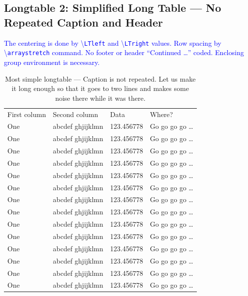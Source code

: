 \documentclass[phd]{ndsu-thesis-2022}
\newcommand\italk[1]{\textcolor{blue}{#1}}  %
\newcommand\cmd[1]{\textbackslash\texttt{#1}}  %
\begin{document}
\subsection{Longtable 2: Simplified Long Table --- No Repeated Caption and Header}

\italk{The centering is done by \cmd{LTleft} and \cmd{LTright} values. Row spacing by \cmd{arraystretch} command. No footer or header ``Continued \ldots'' coded. Enclosing group environment is necessary.}

\begingroup
\setlength{\LTleft}{1mm plus -1fill}%
\setlength{\LTright}{\LTleft}%
\renewcommand{\arraystretch}{0.5}%
\begin{longtable}{l l l l}
\captionsetup{width=\textwidth}
\caption{Most simple longtable --- Caption is not repeated. Let us make it long enough so that it goes to two lines and makes some noise there while it was there.}\\[-20pt]%
\toprule
First column & Second column & Data & Where?\\
\midrule
One & abcdef ghjijklmn & 123.456778  & Go go go go \ldots \\
One & abcdef ghjijklmn & 123.456778  & Go go go go \ldots \\
One & abcdef ghjijklmn & 123.456778  & Go go go go \ldots \\
One & abcdef ghjijklmn & 123.456778  & Go go go go \ldots \\
One & abcdef ghjijklmn & 123.456778  & Go go go go \ldots \\
One & abcdef ghjijklmn & 123.456778  & Go go go go \ldots \\
One & abcdef ghjijklmn & 123.456778  & Go go go go \ldots \\
One & abcdef ghjijklmn & 123.456778  & Go go go go \ldots \\
One & abcdef ghjijklmn & 123.456778  & Go go go go \ldots \\
One & abcdef ghjijklmn & 123.456778  & Go go go go \ldots \\
One & abcdef ghjijklmn & 123.456778  & Go go go go \ldots \\
One & abcdef ghjijklmn & 123.456778  & Go go go go \ldots \\
One & abcdef ghjijklmn & 123.456778  & Go go go go \ldots \\
One & abcdef ghjijklmn & 123.456778  & Go go go go \ldots \\

\end{longtable}
\end{document}
